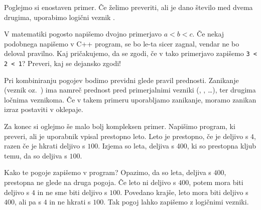 Poglejmo si enostaven primer.
Če želimo preveriti, ali je dano število med dvema drugima, uporabimo
logični veznik \koda{&&}.


V matematiki pogosto napišemo dvojno primerjavo $a < b < c$.
Če nekaj podobnega napišemo v C++ program, se bo le-ta sicer zagnal, vendar
ne bo deloval pravilno.
Kaj pričakujemo, da se zgodi, če v tako primerjavo zapišemo \verb+3 < 2 < 1+?
Preveri, kaj se dejansko zgodi!

Pri kombiniranju pogojev bodimo previdni glede pravil prednosti.
Zanikanje (veznik  oz.~\koda{!}) ima namreč prednost pred primerjalnimi
vezniki (\koda{<}, \koda{==}, \ldots), ter drugima ločnima veznikoma.
Če v takem primeru uporabljamo zanikanje, moramo zanikan izraz postaviti
v oklepaje.

Za konec si oglejmo še malo bolj kompleksen primer.
Napišimo program, ki preveri, ali je uporabnik vpisal prestopno leto.
Leto je prestopno, če je deljivo s $4$, razen če je hkrati deljivo s $100$.
Izjema so leta, deljiva s 400, ki so prestopna kljub temu, da so deljiva s
$100$.

Kako te pogoje zapišemo v program?
Opazimo, da so leta, deljiva s $400$, prestopna ne glede na druga pogoja.
Če leto ni deljivo s $400$, potem mora biti deljivo s $4$ in ne sme biti deljivo s
$100$.
Povedano krajše, leto mora biti deljivo s $400$, ali pa s $4$ in ne hkrati s
$100$.
Tak pogoj lahko zapišemo z logičnimi vezniki.


